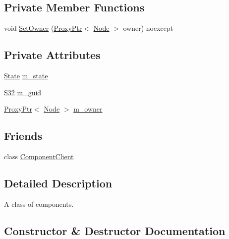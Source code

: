 \subsection*{Private Member Functions}
\begin{DoxyCompactItemize}
\item 
void \hyperlink{classmage_1_1_component_aed5c7f7af79357f708c71572d7d99638}{Set\+Owner} (\hyperlink{classmage_1_1_proxy_ptr}{Proxy\+Ptr}$<$ \hyperlink{classmage_1_1_node}{Node} $>$ owner) noexcept
\end{DoxyCompactItemize}
\subsection*{Private Attributes}
\begin{DoxyCompactItemize}
\item 
\hyperlink{namespacemage_a8159a53ed2ac3a0fe7058b2a051fa969}{State} \hyperlink{classmage_1_1_component_a541a035d18f4d9f3873996716a8192d5}{m\+\_\+state}
\item 
\hyperlink{namespacemage_a642e05c5c83642b6946703615cdbf2da}{S32} \hyperlink{classmage_1_1_component_ab91d982f032cda187dfd3b4bb6b3d3a6}{m\+\_\+guid}
\item 
\hyperlink{classmage_1_1_proxy_ptr}{Proxy\+Ptr}$<$ \hyperlink{classmage_1_1_node}{Node} $>$ \hyperlink{classmage_1_1_component_ad32770e1f30112cebd2894c1e976a4a7}{m\+\_\+owner}
\end{DoxyCompactItemize}
\subsection*{Friends}
\begin{DoxyCompactItemize}
\item 
class \hyperlink{classmage_1_1_component_a12f171c7a6bd27671b33ad16b0e42a6a}{Component\+Client}
\end{DoxyCompactItemize}


\subsection{Detailed Description}
A class of components. 

\subsection{Constructor \& Destructor Documentation}
\hypertarget{classmage_1_1_component_a2326c6df733b0cabf3086ad4187ba607}{}\label{classmage_1_1_component_a2326c6df733b0cabf3086ad4187ba607} 
